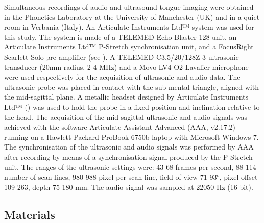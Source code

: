 \documentclass[12pt,]{article}
\begin{document}
\label{s:equipment}

Simultaneous recordings of audio and ultrasound tongue imaging were
obtained in the Phonetics Laboratory at the University of Manchester
(UK) and in a quiet room in Verbania (Italy). An Articulate Instruments
Ltd™ system was used for this study. The system is made of a TELEMED
Echo Blaster 128 unit, an Articulate Instruments Ltd™ P-Stretch
synchronisation unit, and a FocusRight Scarlett Solo pre-amplifier (see
). A TELEMED C3.5/20/128Z-3 ultrasonic transducer
(20mm radius, 2-4 MHz) and a Movo LV4-O2 Lavalier microphone were used
respectively for the acquisition of ultrasonic and audio data. The
ultrasonic probe was placed in contact with the sub-mental triangle,
aligned with the mid-sagittal plane. A metallic headset designed by
Articulate Instruments Ltd™ (\citeyear{articulate2008}) was used to hold
the probe in a fixed position and inclination relative to the head. The
acquisition of the mid-sagittal ultrasonic and audio signals was
achieved with the software Articulate Assistant Advanced (AAA, v2.17.2)
running on a Hawlett-Packard ProBook 6750b laptop with Microsoft Windows
7. The synchronisation of the ultrasonic and audio signals was performed
by AAA after recording by means of a synchronisation signal produced by
the P-Stretch unit. The ranges of the ultrasonic settings were: 43-68
frames per second, 88-114 number of scan lines, 980-988 pixel per scan
line, field of view 71-93°, pixel offset 109-263, depth 75-180 mm. The
audio signal was sampled at 22050 Hz (16-bit).

\subsection{Materials}\label{materials}
\end{document}
